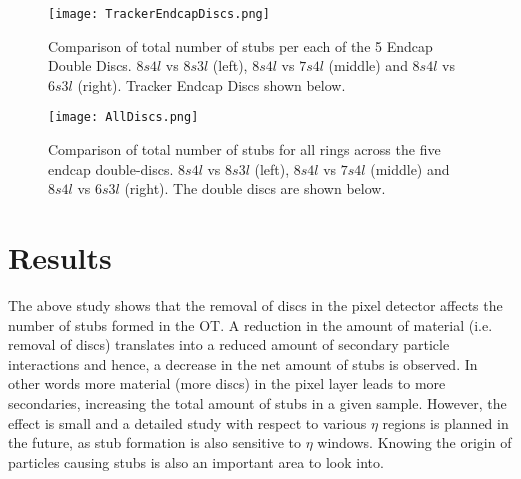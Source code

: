 \begin{figure}[H]
    \centering
\texttt{[image: TrackerEndcapDiscs.png]}
  \caption{Comparison of total number of stubs per each of the 5 Endcap Double Discs. $8s4l$ vs $8s3l$ (left), $8s4l$ vs $7s4l$ (middle) and $8s4l$ vs $6s3l$ (right). Tracker Endcap Discs shown below.}\label{stubsEndcap}
\end{figure}

\begin{figure}[H]
    \centering
\texttt{[image: AllDiscs.png]}
  \caption{Comparison of total number of stubs for all rings across the five endcap double-discs. $8s4l$ vs $8s3l$ (left), $8s4l$ vs $7s4l$ (middle) and $8s4l$ vs $6s3l$ (right). The double discs are shown below.}
\label{stubsPerRing}
\end{figure}

\vspace{1em}

\section{Results}

The above study shows that the removal of discs in the pixel detector affects the number of stubs formed in the OT. A reduction in the amount of material (i.e. removal of discs) translates into a reduced amount of secondary particle interactions and hence, a decrease in the net amount of stubs is observed. In other words more material (more discs) in the pixel layer leads to more secondaries, increasing the total amount of stubs in a given sample. However, the effect is small and a detailed study with respect to various $\eta$ regions is planned in the future, as stub formation is also sensitive to $\eta$ windows. Knowing the origin of particles causing stubs is also an important area to look into.


